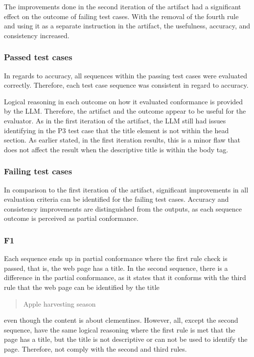 The improvements done in the second iteration of the artifact had a significant effect on the outcome of failing test cases. With the removal of the fourth rule and using it as a separate instruction in the artifact, the usefulness, accuracy, and consistency increased.

\subsubsection{Passed test cases}

In regards to accuracy, all sequences within the passing test cases were evaluated correctly. Therefore, each test case sequence was consistent in regard to accuracy.

Logical reasoning in each outcome on how it evaluated conformance is provided by the LLM. Therefore, the artifact and the outcome appear to be useful for the evaluator. As in the first iteration of the artifact, the LLM still had issues identifying in the P3 test case that the title element is not within the head section. As earlier stated, in the first iteration results, this is a minor flaw that does not affect the result when the descriptive title is within the body tag.

\subsubsection{Failing test cases}

In comparison to the first iteration of the artifact, significant improvements in all evaluation criteria can be identified for the failing test cases. Accuracy and consistency improvements are distinguished from the outputs, as each sequence outcome is perceived as partial conformance. 

\subsubsection{F1}

Each sequence ends up in partial conformance where the first rule check is passed, that is, the web page has a title. In the second sequence, there is a difference in the partial conformance, as it states that it conforms with the third rule that the web page can be identified by the title \blockquote{Apple harvesting season} even though the content is about clementines. However, all, except the second sequence, have the same logical reasoning where the first rule is met that the page has a title, but the title is not descriptive or can not be used to identify the page. Therefore, not comply with the second and third rules.

